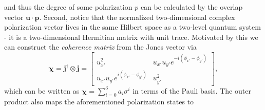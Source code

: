 	and thus the degree of some polarization $p$ can be calculated by the overlap vector $\mathbf{u}\cdot\mathbf{p}$. 
	Second, notice that the normalized two-dimensional complex polarization vector lives in the same Hilbert space as a two-level quantum system - it is a two-dimensional Hermitian matrix with unit trace.
	Motivated by this we can construct the \emph{coherence matrix} from the Jones vector via 
	\begin{equation}
		\mathbf{\chi} = \mathbf{j}^\dagger\otimes\mathbf{j} = \begin{bmatrix} u_{x'}^2 & u_{x'} u_{y'} e^{-i(\phi_{x'}-\phi_{y'})} \\ u_{x'} u_{y'} e^{i(\phi_{x'}-\phi_{y'})} & u_{y'}^2\end{bmatrix},
	\end{equation}
	which can be written as $\mathbf{\chi} = \sum_{i=0}^3 a_i\sigma^{i}$ in terms of the Pauli basis.
	The outer product also maps the aforementioned polarization states to 

